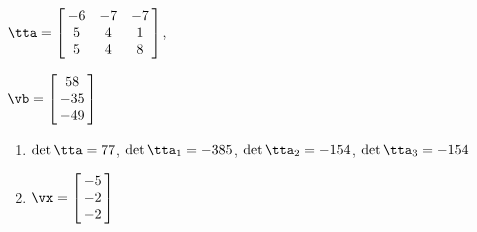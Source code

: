 {$\tta = \left[\hskip -3pt \begin{array}{ccc} -6&-7&-7\\  5&4&1
\\  5&4&8\end{array}\hskip -3pt \right] $,

$\vb = \left[\hskip -3pt \begin{array}{c} 58\\  -35
\\  -49\end{array}\hskip -3pt \right] $}
{\begin{enumerate}
\item	$\det{\tta} = 77$, $\det{\tta_1} = -385$, $\det{\tta_2} = -154$, $\det{\tta_3} = -154$
\item $\vx = \left[\hskip -3pt \begin{array}{c} -5\\  -2\\  
-2\end{array}\hskip -3pt \right] $
\end{enumerate}
}
